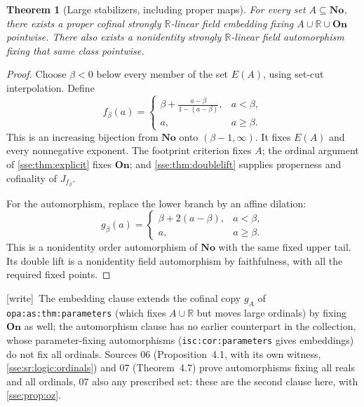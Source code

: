 \documentclass[11pt,a4paper]{article}
\numberwithin{equation}{section}
\theoremstyle{plain}
\newtheorem{theorem}{Theorem}[section]
\theoremstyle{definition}
\theoremstyle{remark}
\newcommand{\No}{\mathbf{No}}
\newcommand{\On}{\mathbf{On}}
\newcommand{\R}{\mathbb{R}}
\newcommand{\lbl}[1]{\nolinkurl{#1}}%
\newcommand{\wtag}{\textup{\textsf{[write]}}}%
\newenvironment{wnote}{\par\smallskip\noindent\wtag\ }{\par\smallskip}
\begin{document}
\begin{theorem}[Large stabilizers, including proper maps]\label{sse:thm:stabilizer}
For every set $A\subseteq\No$, there exists a proper cofinal strongly
$\R$-linear field embedding fixing $A\cup\R\cup\On$ pointwise.
There also exists a nonidentity strongly $\R$-linear field automorphism
fixing that same class pointwise.
\end{theorem}
\begin{proof}
Choose $\beta<0$ below every member of the set $E(A)$, using set-cut
interpolation. Define
\begin{equation}\label{sse:eq:fbeta}
 f_\beta(a)=
 \begin{cases}
 \displaystyle\beta+\frac{a-\beta}{1-(a-\beta)},&a<\beta,\\[2mm]
 a,&a\ge\beta.
 \end{cases}
\end{equation}
This is an increasing bijection from $\No$ onto $(\beta-1,\infty)$.
It fixes $E(A)$ and every nonnegative exponent. The footprint criterion
fixes $A$; the ordinal argument of \cref{sse:thm:explicit} fixes $\On$; and
\cref{sse:thm:doublelift} supplies properness and cofinality of $J_{f_\beta}$.

For the automorphism, replace the lower branch by an affine dilation:
\begin{equation}\label{sse:eq:gbeta}
 g_\beta(a)=
 \begin{cases}
 \beta+2(a-\beta),&a<\beta,\\
 a,&a\ge\beta.
 \end{cases}
\end{equation}
This is a nonidentity order automorphism of $\No$ with the same fixed
upper tail. Its double lift is a nonidentity field automorphism by
faithfulness, with all the required fixed points.
\end{proof}
\begin{wnote}The embedding clause extends the cofinal copy $g_A$ of \lbl{opa:as:thm:parameters} (which fixes $A\cup\R$ but moves large ordinals) by fixing $\On$ as well; the automorphism clause has no earlier counterpart in the collection, whose parameter-fixing automorphisms (\lbl{isc:cor:parameters} gives embeddings) do not fix all ordinals. Sources 06 (Proposition~4.1, with its own witness, \cref{sse:sr:logic:ordinals}) and 07 (Theorem~4.7) prove automorphisms fixing all reals and all ordinals, 07 also any prescribed set: these are the second clause here, with \cref{sse:prop:oz}.\end{wnote}
\end{document}
